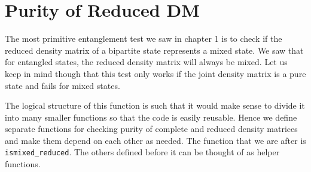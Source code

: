 \section{Purity of Reduced DM}
The most primitive entanglement test we saw in chapter 1 is to check if the reduced density matrix of a bipartite state represents a mixed state. We saw that for entangled states, the reduced density matrix will always be mixed. Let us keep in mind though that this test only works if the joint density matrix is a pure state and fails for mixed states.
\par The logical structure of this function is such that it would make sense to divide it into many smaller functions so that the code is easily reusable. Hence we define separate functions for checking purity of complete and reduced density matrices and make them depend on each other as needed. The function that we are after is \texttt{ismixed\_reduced}. The others defined before it can be thought of as helper functions.
